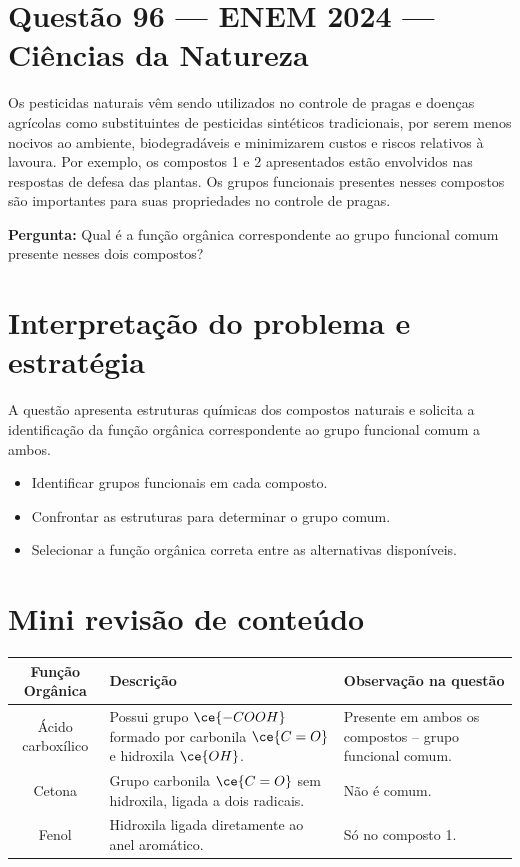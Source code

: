 \documentclass{article}
\begin{document}
\section*{Questão 96 — ENEM 2024 — Ciências da Natureza}

Os pesticidas naturais vêm sendo utilizados no controle de pragas e doenças agrícolas como substituintes de pesticidas sintéticos tradicionais, por serem menos nocivos ao ambiente, biodegradáveis e minimizarem custos e riscos relativos à lavoura. Por exemplo, os compostos 1 e 2 apresentados estão envolvidos nas respostas de defesa das plantas. Os grupos funcionais presentes nesses compostos são importantes para suas propriedades no controle de pragas.

\textbf{Pergunta:} Qual é a função orgânica correspondente ao grupo funcional comum presente nesses dois compostos?

\section*{Interpretação do problema e estratégia}

A questão apresenta estruturas químicas dos compostos naturais e solicita a identificação da função orgânica correspondente ao grupo funcional comum a ambos.

\begin{itemize}
  \item Identificar grupos funcionais em cada composto.
  \item Confrontar as estruturas para determinar o grupo comum.
  \item Selecionar a função orgânica correta entre as alternativas disponíveis.
\end{itemize}

\section*{Mini revisão de conteúdo}

\begin{tabular}{|c|p{6cm}|p{7cm}|}
\hline
Função Orgânica & Descrição & Observação na questão \\
\hline
Ácido carboxílico & Possui grupo \( \ce{-COOH} \) formado por carbonila \(\ce{C=O}\) e hidroxila \(\ce{OH}\). & Presente em ambos os compostos -- grupo funcional comum.
\\
\hline
Cetona & Grupo carbonila \(\ce{C=O}\) sem hidroxila, ligada a dois radicais. & Não é comum.
\\
\hline
Fenol & Hidroxila ligada diretamente ao anel aromático. & Só no composto 1.
\\
\hline
\end{tabular}
\end{document}
